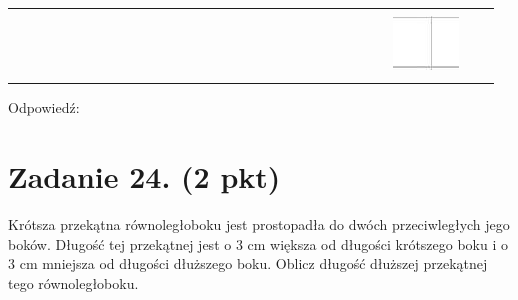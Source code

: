\documentclass[10pt]{article}
\begin{document}
\begin{center}
\begin{tabular}{|c|c|c|c|c|c|c|c|c|c|c|c|c|c|c|c|c|c|c|c|c|c|c|c|c|c|c|c|c|c|}
 &  &  \\
\hline
 &  &  &  &  &  &  &  &  &  &  &  &  &  &  &  &  &  &  &  &  &  &  &  &  &  &  &  &  &  \\
\hline
 &  &  &  &  &  &  &  &  &  &  &  &  &  &  &  &  &  &  &  &  &  &  &  &  &  &  & \includegraphics[max width=\textwidth]{2024_11_21_6438f6dbc3784fe6d1deg-09(1)}
 &  &  \\
\hline
 &  &  &  &  &  &  &  &  &  &  &  &  &  &  &  &  &  &  &  &  &  &  &  &  &  &  &  &  &  \\
\hline
\end{tabular}
\end{center}

Odpowiedź:

\section*{Zadanie 24. (2 pkt)}
Krótsza przekątna równoległoboku jest prostopadła do dwóch przeciwległych jego boków. Długość tej przekątnej jest o 3 cm większa od długości krótszego boku i o 3 cm mniejsza od długości dłuższego boku. Oblicz długość dłuższej przekątnej tego równoległoboku.
\end{document}
